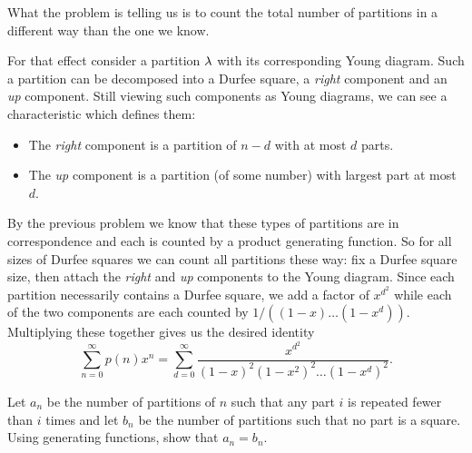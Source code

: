 \documentclass[12pt]{memoir}
\begin{document}
\begin{ptcbr}
What the problem is telling us is to count the total number of partitions in a different way than the one we know.\par 
For that effect consider a partition $\lambda$ with its corresponding Young diagram. Such a partition can be decomposed into a Durfee square, a \emph{right} component and an \emph{up} component. Still viewing such components as Young diagrams, we can see a characteristic which defines them:
\vspace*{-0.4em}
\begin{itemize}
    \itemsep=-0.4em
    \item The \emph{right} component is a partition of $n-d$ with at most $d$ parts.
    \item The \emph{up} component is a partition (of some number) with largest part at most $d$. 
\end{itemize} 
By the previous problem we know that these types of partitions are in correspondence and each is counted by a product generating function. So for all sizes of Durfee squares we can count all partitions these way: fix a Durfee square size, then attach the \emph{right} and \emph{up} components to the Young diagram. Since each partition necessarily contains a Durfee square, we add a factor of $x^{d^2}$ while each of the two components are each counted by $1/((1-x)\dots(1-x^d))$. Multiplying these together gives us 
the desired identity 
$$\sum_{n=0}^\infty p(n)x^n=\sum_{d=0}^\infty \frac{x^{d^2}}{(1-x)^2(1-x^2)^2\dots(1-x^d)^2}.$$
\end{ptcbr}
\newpage
\begin{Ej}
    Let $a_n$ be the number of partitions of $n$ such that any part $i$
 is repeated fewer than $i$ times and let $b_n$ be the number of partitions such that no part is a square. Using generating functions, show that $a_n=b_n$.
\end{Ej}
\end{document}

